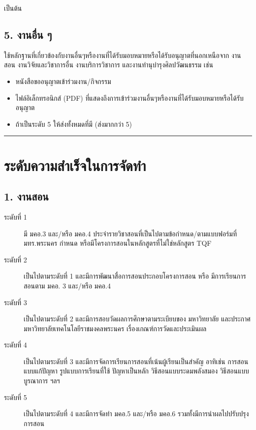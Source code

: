 \documentclass[a4paper,12pt,english]{sphinxmanual}
\begin{document}
เป็นต้น


\subsection{5. งานอื่น ๆ}
\label{\detokenize{submission_part1:id11}}
ใช้หลักฐานที่เกี่ยวข้องกับงานอื่นๆหรืองานที่ได้รับมอบหมายหรือได้รับอนุญาตที่นอกเหนือจาก งานสอน งานวิจัยและวิชาการอื่น งานบริการวิชาการ และงานทำนุบำรุงศิลปวัฒนธรรม เช่น
\begin{itemize}
\item {} 
หนังสือขออนุญาตเข้าร่วมงาน/กิจกรรม

\item {} 
ไฟล์อิเล็กทรอนิกส์ (PDF) ที่แสดงถึงการเข้าร่วมงานอื่นๆหรืองานที่ได้รับมอบหมายหรือได้รับอนุญาต

\item {} 
ถ้าเป็นระดับ 5 ให้ส่งทั้งหมดที่มี (ส่งมากกว่า 5)

\end{itemize}


\bigskip\hrule\bigskip



\section{ระดับความสำเร็จในการจัดทำ}
\label{\detokenize{submission_part1:id12}}

\subsection{1. งานสอน}
\label{\detokenize{submission_part1:id13}}\begin{description}
\item[{ระดับที่ 1}] \leavevmode
มี มคอ.3 และ/หรือ มคอ.4 ประจำรายวิชาสอนที่เป็นไปตามข้อกำหนด/ตามแบบฟอร์มที่ มทร.พระนคร กำหนด หรือมีโครงการสอนในหลักสูตรที่ไม่ใช่หลักสูตร TQF

\item[{ระดับที่ 2}] \leavevmode
เป็นไปตามระดับที่ 1 และมีการพัฒนาสื่อการสอนประกอบโครงการสอน หรือ มีการเรียนการสอนตาม มคอ. 3 และ/หรือ มคอ.4

\item[{ระดับที่ 3}] \leavevmode
เป็นไปตามระดับที่ 2 และมีการสอบวัดผลการศึกษาตามระเบียบของ มหาวิทยาลัย และประกาศมหาวิทยาลัยเทคโนโลยีราชมงคลพระนคร เรื่องเกณฑ์การวัดและประเมินผล

\item[{ระดับที่ 4}] \leavevmode
เป็นไปตามระดับที่ 3  และมีการจัดการเรียนการสอนที่เน้นผู้เรียนเป็นสำคัญ อาทิเช่น การสอนแบบแก้ปัญหา รูปแบบการเรียนที่ใช้
ปัญหาเป็นหลัก วิธีสอนแบบระดมพลังสมอง วิธีสอนแบบบูรณาการ ฯลฯ

\item[{ระดับที่ 5}] \leavevmode
เป็นไปตามระดับที่ 4 และมีการจัดทำ มคอ.5 และ/หรือ มคอ.6 รวมทั้งมีการนำผลไปปรับปรุงการสอน

\end{description}
\end{document}
